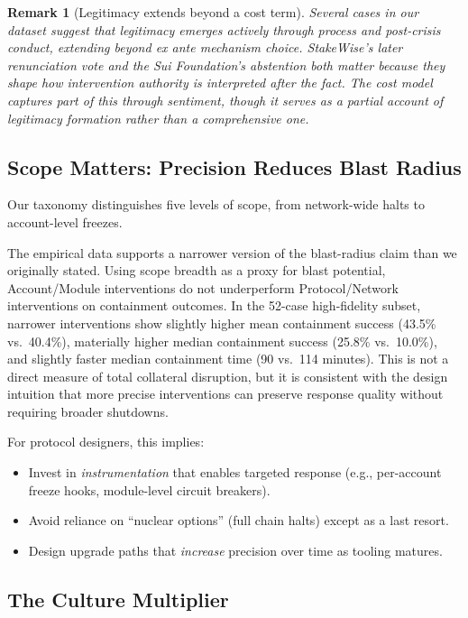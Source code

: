 \documentclass[12pt]{article}
\newtheorem{remark}{Remark}
\begin{document}
\begin{remark}[Legitimacy extends beyond a cost term]
Several cases in our dataset suggest that legitimacy emerges actively through process and post-crisis conduct, extending beyond ex ante mechanism choice. StakeWise's later renunciation vote and the Sui Foundation's abstention both matter because they shape how intervention authority is interpreted after the fact. The cost model captures part of this through sentiment, though it serves as a partial account of legitimacy formation rather than a comprehensive one.
\end{remark}



\subsection{Scope Matters: Precision Reduces Blast Radius}
\label{subsec:scope-implications}

Our taxonomy distinguishes five levels of scope, from network-wide halts to account-level freezes.

The empirical data supports a narrower version of the blast-radius claim than we originally stated. Using scope breadth as a proxy for blast potential, Account/Module interventions do not underperform Protocol/Network interventions on containment outcomes. In the 52-case high-fidelity subset, narrower interventions show slightly higher mean containment success (43.5\% vs.\ 40.4\%), materially higher median containment success (25.8\% vs.\ 10.0\%), and slightly faster median containment time (90 vs.\ 114 minutes). This is not a direct measure of total collateral disruption, but it is consistent with the design intuition that more precise interventions can preserve response quality without requiring broader shutdowns.

For protocol designers, this implies:

\begin{itemize}
    \item Invest in \emph{instrumentation} that enables targeted response (e.g., per-account freeze hooks, module-level circuit breakers).
    \item Avoid reliance on ``nuclear options'' (full chain halts) except as a last resort.
    \item Design upgrade paths that \emph{increase} precision over time as tooling matures.
\end{itemize}


\subsection{The Culture Multiplier}
\label{subsec:culture}
\end{document}
